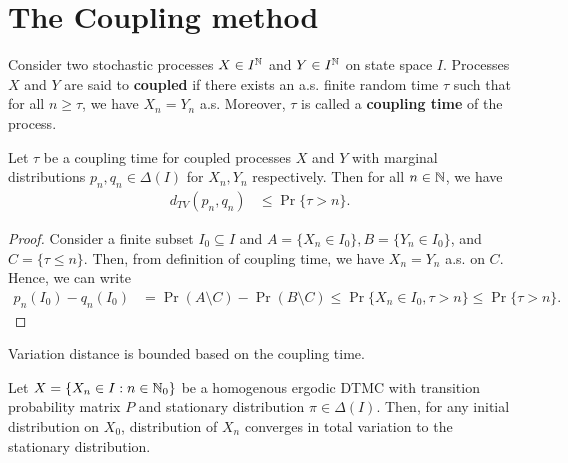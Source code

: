 \documentclass[a4paper,10pt,english]{article}
\begin{document}
\section{The Coupling method}
\begin{defn} Consider two stochastic processes $X \in I^{\mathbb{N}}$ and $Y \in I^{\mathbb{N}}$ on state space $I$. %
Processes $X$ and $Y$ are said to \textbf{coupled} if  there exists an a.s. finite random time $\tau$ such that for all $n \geq \tau$, we have $X_n = Y_n$ a.s. Moreover, $\tau$ is called a \textbf{coupling time} of the process.
\end{defn}
\begin{thm} Let $\tau$ be a coupling time for coupled processes $X$ and $Y$  with marginal distributions $p_n,q_n \in \Delta(I)$ for $X_n,Y_n$ respectively. Then for all $n \in \mathbb{N}$, we have 
\begin{align*}
d_{TV} (p_n,q_n) &\leq \Pr\{\tau > n\}.
\end{align*}
\end{thm}
\begin{proof} Consider a finite subset $I_0 \subseteq I$ and $A = \{X_n \in I_0\}, B = \{Y_n \in I_0\}$, and $C = \{\tau \leq n\}$. Then, from definition of coupling time, we have $X_n = Y_n$ a.s. on $C$. Hence, we can write 
\begin{align*}
p_n(I_0) - q_n(I_0) &= %
\Pr(A \setminus C) - \Pr(B \setminus C) \leq \Pr\{X_n \in I_0, \tau > n\} \leq \Pr\{\tau > n\}.
\end{align*}
\end{proof}
\begin{rem} Variation distance is bounded based on the coupling time.
 \end{rem}
\begin{thm}
Let $X = \{X_n \in I: n \in \mathbb{N}_0 \}$ be a homogenous ergodic DTMC with transition probability matrix $P$ and stationary distribution $\pi \in \Delta(I)$. Then, for any initial distribution on $X_0$, distribution of $X_n$ converges in total variation to the stationary distribution.
\end{thm}
\end{document}
